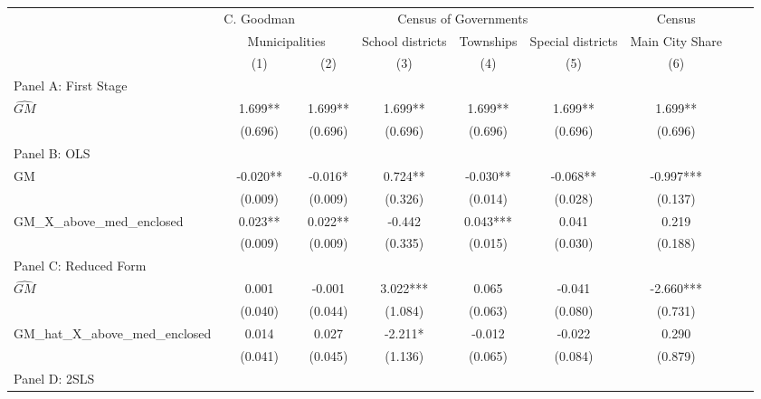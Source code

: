  \begin{tabular}{l*{8}{c}} \toprule
&\multicolumn{1}{c}{C. Goodman}&\multicolumn{4}{c}{Census of Governments}&\multicolumn{1}{c}{Census}\\\cmidrule(lr){2-2}\cmidrule(lr){3-6}\cmidrule(lr){7-7}
&\multicolumn{2}{c}{Municipalities}&\multicolumn{1}{c}{School districts}&\multicolumn{1}{c}{Townships}&\multicolumn{1}{c}{Special districts}&\multicolumn{1}{c}{Main City Share}\\\cmidrule(lr){2-3}\cmidrule(lr){4-6}\cmidrule(lr){7-7}
&\multicolumn{1}{c}{(1)}&\multicolumn{1}{c}{(2)}&\multicolumn{1}{c}{(3)}&\multicolumn{1}{c}{(4)}&\multicolumn{1}{c}{(5)}&\multicolumn{1}{c}{(6)}\\
\cmidrule(lr){1-7}
\multicolumn{6}{l}{Panel A: First Stage}\\
\cmidrule(lr){1-7}
$\widehat{GM}$  &    1.699** &    1.699** &    1.699** &    1.699** &    1.699** &    1.699** \\
                &  (0.696)   &  (0.696)   &  (0.696)   &  (0.696)   &  (0.696)   &  (0.696)   \\
\cmidrule(lr){1-7}
\multicolumn{6}{l}{Panel B: OLS}\\
\cmidrule(lr){1-7}
GM              &   -0.020** &   -0.016*  &    0.724** &   -0.030** &   -0.068** &   -0.997***\\
                &  (0.009)   &  (0.009)   &  (0.326)   &  (0.014)   &  (0.028)   &  (0.137)   \\
\addlinespace
GM\_X\_above\_med\_enclosed&    0.023** &    0.022** &   -0.442   &    0.043***&    0.041   &    0.219   \\
                &  (0.009)   &  (0.009)   &  (0.335)   &  (0.015)   &  (0.030)   &  (0.188)   \\
\cmidrule(lr){1-7}
\multicolumn{6}{l}{Panel C: Reduced Form}\\
\cmidrule(lr){1-7}
$\widehat{GM}$  &    0.001   &   -0.001   &    3.022***&    0.065   &   -0.041   &   -2.660***\\
                &  (0.040)   &  (0.044)   &  (1.084)   &  (0.063)   &  (0.080)   &  (0.731)   \\
\addlinespace
GM\_hat\_X\_above\_med\_enclosed&    0.014   &    0.027   &   -2.211*  &   -0.012   &   -0.022   &    0.290   \\
                &  (0.041)   &  (0.045)   &  (1.136)   &  (0.065)   &  (0.084)   &  (0.879)   \\
\cmidrule(lr){1-7}
\multicolumn{6}{l}{Panel D: 2SLS}\\

\end{tabular}
